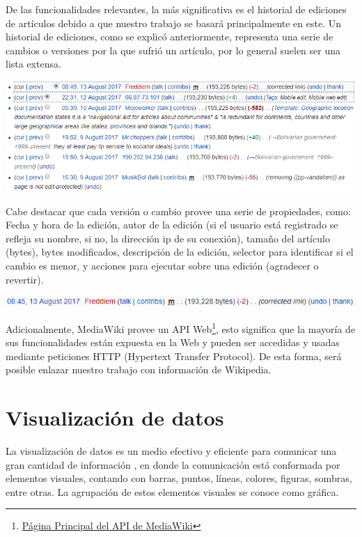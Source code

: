 De las funcionalidades relevantes, la más significativa es el historial de ediciones de artículos debido a que nuestro trabajo se basará principalmente en este. Un historial de ediciones, como se explicó anteriormente, representa una serie de cambios o versiones por la que sufrió un artículo, por lo general suelen ser una lista extensa.

\begin{center}
    \bigbreak
    \includegraphics[scale=0.40]{images/marco_teorico/history.png}
    \label{fig:marco_teorico_history}
    \bigbreak
\end{center}

Cabe destacar que cada versión o cambio provee una serie de propiedades, como: Fecha y hora de la edición, autor de la edición (si el usuario está registrado se refleja su nombre, si no, la dirección ip de su conexión), tamaño del artículo (bytes), bytes modificados, descripción de la edición, selector para identificar si el cambio es menor, y acciones para ejecutar sobre una edición (agradecer o revertir).

\begin{center}
    \bigbreak
    \includegraphics[scale=0.45]{images/marco_teorico/history_detail.png}
    \label{fig:marco_teorico_history_detail}
    \bigbreak
\end{center}

Adicionalmente, MediaWiki provee un API Web\footnote{\href{https://www.mediawiki.org/wiki/API:Main_page}{Página Principal del API de MediaWiki}}, esto significa que la mayoría de sus funcionalidades están expuesta en la Web y pueden ser accedidas y usadas mediante peticiones HTTP (Hypertext Transfer Protocol). De esta forma, será posible enlazar nuestro trabajo con información de Wikipedia.

\section{Visualización de datos}
La visualización de datos es un medio efectivo y eficiente para comunicar una gran cantidad de información \cite{DesignData}, en donde la comunicación está conformada por elementos visuales, contando con barras, puntos, líneas, colores, figuras, sombras, entre otras. La agrupación de estos elementos visuales se conoce como gráfica.

